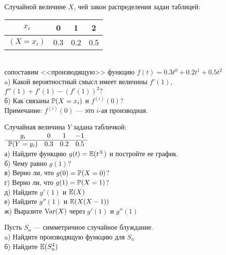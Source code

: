 \begin{problem}
  Случайной величине $X$, чей закон распределения задан таблицей: \\
\begin{tabular}{|c|c|c|c|}
  \hline
  $x_{i}$ & 0 & 1 & 2 \\
  \hline
  $(X=x_{i})$ & 0.3 & 0.2 & 0.5 \\
  \hline
\end{tabular} \\
сопоставим <<производящую>> функцию
$f(t)=0.3t^{0}+0.2t^{1}+0.5t^{2}$ \\
a) Какой вероятностный смысл имеет величины $f'(1)$,
$f''(1)+f'(1)-(f'(1))^{2}$? \\
б) Как связаны $\P(X=x_{i})$ и $f^{(i)}(0)$? \\
Примечание: $f^{(i)}(0)$ — это $i$-ая производная.

\begin{sol}

\end{sol}
\end{problem}

\begin{problem}
Случайная величина $Y$ задана табличкой: \\
$\begin{array}{cccc}
  y_{i} & 0 & 1 & -1 \\
  \hline
  \P(Y=y_{i}) & 0.3 & 0.2 & 0.5 \\
\end{array}$ \\
а) Найдите функцию $g(t)=\E(t^{X})$ и постройте ее график. \\
б) Чему равно $g(1)$? \\
в) Верно ли, что $g(0)=\P(X=0)$? \\
г) Верно ли, что $g(1)=\P(X=1)$? \\
д) Найдите $g'(1)$ и $\E(X)$ \\
е) Найдите $g''(1)$ и $\E(X(X-1))$ \\
ж) Выразите $\Var(X)$ через $g'(1)$ и $g''(1)$

\begin{sol}

\end{sol}
\end{problem}

\begin{problem}
Пусть $S_{n}$ — симметричное случайное блуждание. \\
a) Найдите производящую функцию для $S_{n}$ \\
б) Найдите $\E(S_{n}^{4})$

\begin{sol}

\end{sol}
\end{problem}

